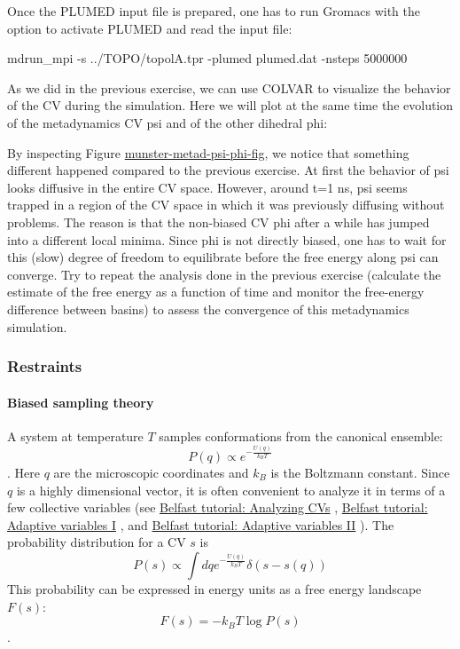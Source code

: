 Once the P\+L\+U\+M\+E\+D input file is prepared, one has to run Gromacs with the option to activate P\+L\+U\+M\+E\+D and read the input file\+:

\begin{DoxyVerb}mdrun_mpi -s ../TOPO/topolA.tpr -plumed plumed.dat -nsteps 5000000
\end{DoxyVerb}


As we did in the previous exercise, we can use C\+O\+L\+V\+A\+R to visualize the behavior of the C\+V during the simulation. Here we will plot at the same time the evolution of the metadynamics C\+V psi and of the other dihedral phi\+:

\label{munster_munster-metad-psi-phi-fig}%
\hypertarget{munster_munster-metad-psi-phi-fig}{}%
 By inspecting Figure \hyperlink{munster_munster-metad-psi-phi-fig}{munster-\/metad-\/psi-\/phi-\/fig}, we notice that something different happened compared to the previous exercise. At first the behavior of psi looks diffusive in the entire C\+V space. However, around t=1 ns, psi seems trapped in a region of the C\+V space in which it was previously diffusing without problems. The reason is that the non-\/biased C\+V phi after a while has jumped into a different local minima. Since phi is not directly biased, one has to wait for this (slow) degree of freedom to equilibrate before the free energy along psi can converge. Try to repeat the analysis done in the previous exercise (calculate the estimate of the free energy as a function of time and monitor the free-\/energy difference between basins) to assess the convergence of this metadynamics simulation.\hypertarget{munster_munster-biasing-re}{}\subsubsection{Restraints}\label{munster_munster-biasing-re}
 \hypertarget{munster_munster-biased-sampling-theory}{}\paragraph{Biased sampling theory}\label{munster_munster-biased-sampling-theory}
A system at temperature $ T$ samples conformations from the canonical ensemble\+: \[ P(q)\propto e^{-\frac{U(q)}{k_BT}} \]. Here $ q $ are the microscopic coordinates and $ k_B $ is the Boltzmann constant. Since $ q $ is a highly dimensional vector, it is often convenient to analyze it in terms of a few collective variables (see \hyperlink{belfast-1}{Belfast tutorial\+: Analyzing C\+Vs} , \hyperlink{belfast-2}{Belfast tutorial\+: Adaptive variables I} , and \hyperlink{belfast-3}{Belfast tutorial\+: Adaptive variables I\+I} ). The probability distribution for a C\+V $ s$ is \[ P(s)\propto \int dq e^{-\frac{U(q)}{k_BT}} \delta(s-s(q)) \] This probability can be expressed in energy units as a free energy landscape $ F(s) $\+: \[ F(s)=-k_B T \log P(s) \].

